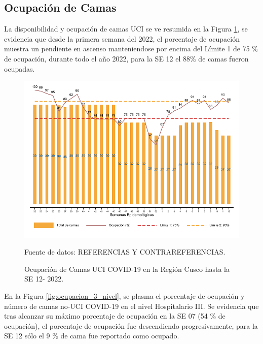 \documentclass[12pt,a4paper,openany]{book}
\begin{document}


\clearpage
\subsection*{Ocupación de Camas}
\noindent La disponibilidad y ocupación de camas UCI se ve resumida en la Figura \ref{fig:ocupacion_uci}, se evidencia que desde la primera semana del 2022, el porcentaje de ocupación muestra un pendiente en ascenso manteniendose por encima del Límite 1 de 75 $\%$ de ocupación, durante todo el año 2022, para la SE 12 el 88$\%$ de camas fueron ocupadas.

\begin{figure}[h]
	\caption{Ocupación de Camas UCI COVID-19 en la Región Cusco hasta la SE 12- 2022.}\label{fig:ocupacion_uci}
	\begin{center}
		\includegraphics[width=0.95\linewidth]{../figuras/uci.pdf}
	\end{center}
	{\footnotesize {Fuente de datos: REFERENCIAS Y CONTRAREFERENCIAS.}}
\end{figure}
\cleardoublepage

En la Figura \ref{fig:ocupacion_3_nivel}, se plasma el porcentaje de ocupación y número de camas no-UCI COVID-19 en el nivel Hospitalario III. Se evidencia que tras alcanzar su máximo porcentaje de ocupación en la SE 07 (54 $\%$ de ocupación), el porcentaje de ocupación fue descendiendo progresivamente, para la SE 12 sólo el 9 $\%$  de cama fue reportado como ocupado. 
  
\end{document}
